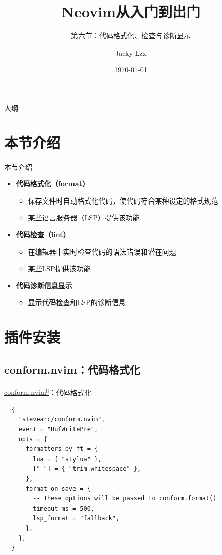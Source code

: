 \documentclass[aspectratio=169]{ctexbeamer}
\title{Neovim从入门到出门}
\subtitle{第六节：代码格式化、检查与诊断显示}
\author{Jacky-Lzx}
\date{\today}
\newcommand{\nerd}[1]{\texttt{#1}}
\newcommand{\link}[3][]{\href{#3}{#2\textsuperscript{\nerd{}}}}
\begin{document}
\begin{frame}
  \titlepage
\end{frame}

\begin{frame}{大纲}
  \tableofcontents
\end{frame}

\section{本节介绍}

  \begin{frame}{本节介绍}
    \begin{itemize}
      \item \textbf{代码格式化（format）}
        \begin{itemize}
          \item 保存文件时自动格式化代码，使代码符合某种设定的格式规范
          \item 某些语言服务器（LSP）提供该功能
        \end{itemize}
      \item \textbf{代码检查（lint）}
        \begin{itemize}
          \item 在编辑器中实时检查代码的语法错误和潜在问题
          \item 某些LSP提供该功能
        \end{itemize}
      \item \textbf{代码诊断信息显示}
        \begin{itemize}
          \item 显示代码检查和LSP的诊断信息
        \end{itemize}
    \end{itemize}

  \end{frame}

\section{插件安装}

  \subsection{conform.nvim：代码格式化}
    \begin{frame}[fragile]{\link{conform.nvim}{https://github.com/stevearc/conform.nvim}：代码格式化}
      \begin{lstlisting}
  {
    "stevearc/conform.nvim",
    event = "BufWritePre",
    opts = {
      formatters_by_ft = {
        lua = { "stylua" },
        ["_"] = { "trim_whitespace" },
      },
      format_on_save = {
        -- These options will be passed to conform.format()
        timeout_ms = 500,
        lsp_format = "fallback",
      },
    },
  }
      \end{lstlisting}
    \end{frame}
\end{document}
